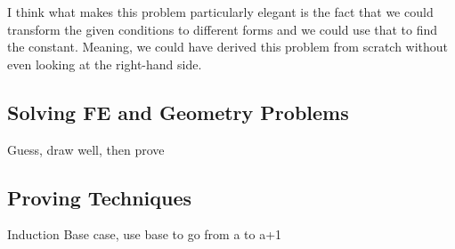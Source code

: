 \documentclass[../../../main.tex]{subfiles}
\begin{document}
I think what makes this problem particularly elegant is the fact
that we could transform the given conditions to different forms
and we could use that to find the constant. Meaning, we could have
derived this problem from scratch without even looking at the
right-hand side.

\subsection{Solving FE and Geometry Problems}

Guess, draw well, then prove


\subsection{Proving Techniques}

Induction
    Base case, use base to go from a to a+1
\end{document}
